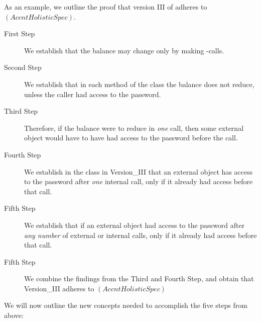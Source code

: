 As an example, we   outline the proof that version III of  adheres to $(AccntHolisticSpec)$.

\begin{description}
\item[First Step] We establish that the balance %
may change only   by making -\internalC calls.  


\item[Second Step] 
We establish that in each method of the class  
the balance does not reduce, unless the caller had access 
to the password.

\item[Third Step]  
Therefore, if the balance were to reduce in \emph{one} call, then some
external object would have to have had access to the password before the call.

\item[Fourth Step] We establish in the class  in Version\_III 
that   an external object has access to 
the password after \emph{one} internal call, only if it already had access before that call.

\item[Fifth Step] We establish  that if an external object had access to 
the password after \emph{any number} of external or internal 
calls, only if it already had access before that call.

\item[Fifth Step] We   combine the findings from the Third and Fourth Step, and obtain
that  Version\_III adheres to $(AccntHolisticSpec)$

\end{description} 
 
We will now outline 
the new concepts needed to accomplish the five steps from above:

